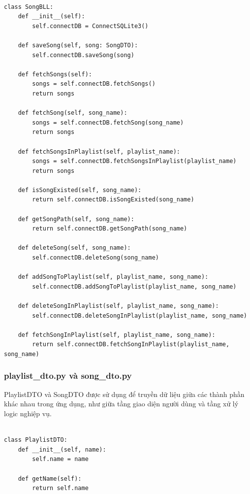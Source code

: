 \documentclass[a4paper]{article}
\begin{document}
\begin{mdframed}[hidealllines=true,backgroundcolor=magenta!10]
\begin{lstlisting}

class SongBLL:
    def __init__(self):
        self.connectDB = ConnectSQLite3()

    def saveSong(self, song: SongDTO):
        self.connectDB.saveSong(song)

    def fetchSongs(self):
        songs = self.connectDB.fetchSongs()
        return songs

    def fetchSong(self, song_name):
        songs = self.connectDB.fetchSong(song_name)
        return songs

    def fetchSongsInPlaylist(self, playlist_name):
        songs = self.connectDB.fetchSongsInPlaylist(playlist_name)
        return songs

    def isSongExisted(self, song_name):
        return self.connectDB.isSongExisted(song_name)

    def getSongPath(self, song_name):
        return self.connectDB.getSongPath(song_name)

    def deleteSong(self, song_name):
        self.connectDB.deleteSong(song_name)

    def addSongToPlaylist(self, playlist_name, song_name):
        self.connectDB.addSongToPlaylist(playlist_name, song_name)

    def deleteSongInPlaylist(self, playlist_name, song_name):
        self.connectDB.deleteSongInPlaylist(playlist_name, song_name)

    def fetchSongInPlaylist(self, playlist_name, song_name):
        return self.connectDB.fetchSongInPlaylist(playlist_name, song_name)

\end{lstlisting}
\end{mdframed}

\subsubsection{playlist\_dto.py và song\_dto.py}
PlaylistDTO và SongDTO được sử dụng để truyền dữ liệu giữa các thành phần khác nhau trong ứng dụng, như giữa tầng giao diện người dùng và tầng xử lý logic nghiệp vụ.
\begin{mdframed}[hidealllines=true,backgroundcolor=magenta!10]
\begin{lstlisting}

class PlaylistDTO:
    def __init__(self, name):
        self.name = name

    def getName(self):
        return self.name


\end{lstlisting}
\end{mdframed}
\end{document}

